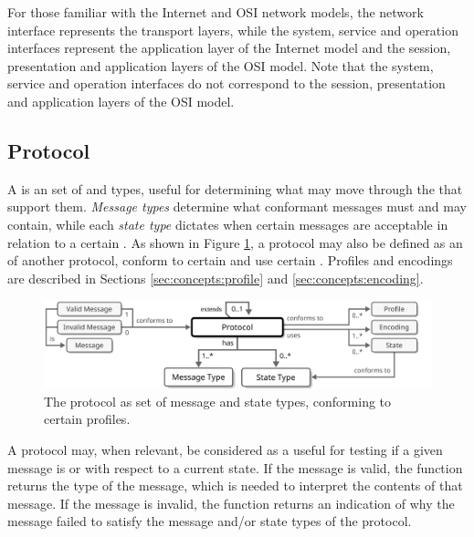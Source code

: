 For those familiar with the Internet \cite{rfc1122} and OSI \cite{iso7498_1} network models, the network interface represents the transport layers, while the system, service and operation interfaces represent the application layer of the Internet model and the session, presentation and application layers of the OSI model.
Note that the system, service and operation interfaces do not correspond to the session, presentation and application layers of the OSI model.

\subsection{Protocol}
\label{sec:concepts:protocol}

A  is an  set of  and  types, useful for determining what  may move through the  that support them.
\textit{Message types} determine what  conformant messages must and may contain, while each \textit{state type} dictates when certain messages are acceptable in relation to a certain .
As shown in Figure \ref{fig:protocol}, a protocol may also be defined as an  of another protocol, conform to certain  and use certain .
Profiles and encodings are described in Sections \ref{sec:concepts:profile} and \ref{sec:concepts:encoding}.

\begin{figure}[ht!]
  \centering
  \includegraphics[scale=0.9]{figures/protocol}
  \caption{
    The protocol as set of message and state types, conforming to certain profiles.
  }
  \label{fig:protocol}
\end{figure}

A protocol may, when relevant, be considered as a  useful for testing if a given message is  or  with respect to a current state.
If the message is valid, the function returns the type of the message, which is needed to interpret the contents of that message.
If the message is invalid, the function returns an indication of why the message failed to satisfy the message and/or state types of the protocol. 

